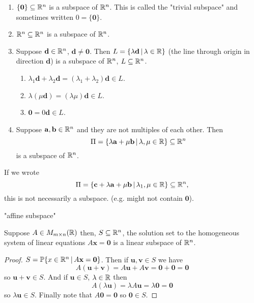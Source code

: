 \documentclass[10pt, a4paper]{article}
\newcommand{\mbf}[1]{\mathbf{#1}}
\begin{document}
\begin{example}\phantom{}
    \begin{enumerate}[label = (\roman*)]
        \item $\{\mbf{0}\} \subseteq \R ^ n$ is a subspace of $\mathbb{R} ^ n$.
        This is called the "trivial subspace" and sometimes written $0 = \{\mbf{0}\}$.
        \item $\mathbb{R} ^ n \subseteq \mathbb{R} ^ n$ is a subspace of $\mathbb{R} ^ n$.
        \item Suppose $\mbf{d} \in \R ^ n$, $\mbf{d \neq 0}$.
        Then $L = \{\lambda\mbf{d}\,|\,\lambda \in \R\}$
        (the line through origin in direction $\mbf{d}$)
        is a subspace of $\mathbb{R} ^ n$, $L \subseteq \mathbb{R} ^ n$.
            \begin{enumerate}[label = (\roman*)]
                \item $\lambda_1 \mbf{d} + \lambda_2\mbf{d} = (\lambda_1 + \lambda_2)\mbf{d} \in L$.
                \item $\lambda(\mu\mbf{d}) = (\lambda\mu)\mbf{d} \in L$.
                \item $\mbf{0} = 0\mbf{d} \in L$.
            \end{enumerate}
        \item Suppose $\mbf{a, b} \in \R ^ n$ and they are not multiples of each other.
        Then
        \[
        \Pi = \{\lambda\mbf{a} + \mu\mbf{b}\,|\,\lambda, \mu \in \R\} \subseteq \R ^ n
        \]
        is a subspace of $\mathbb{R} ^ n$.
    \end{enumerate}
    If we wrote
    \[
    \Pi = \{\mbf{c} + \lambda\mbf{a} + \mu\mbf{b}\,|\,\lambda_1, \mu \in \R\} \subseteq \R ^ n,
    \]
    this is not necessarily a subspace.
    (e.g. might not contain $\mbf{0}$).
\end{example}

"affine subspace"

\begin{proposition}
    Suppose $A \in M_{m \times n}(\mathbb{R})$ then,
    $S \subseteq \mathbb{R} ^ n$,
    the solution set to the homogeneous system of linear equations $A\mbf{x} = \mbf{0}$ is a linear subspace of $\mathbb{R} ^ n$.
    \begin{proof}
        $S = \P\{x \in \R ^ n\,|\, A\mbf{x} = \mbf{0}\}$.
        Then if $\mbf{u, v} \in S$ we have
        \[
        A(\mbf{u + v}) = A\mbf{u} + A\mbf{v} = \mbf{0} + \mbf{0} = \mbf{0}
        \]
        so $\mbf{u + v} \in S$.
        And if $\mbf{u} \in S$, $\lambda \in \mathbb{R}$ then
        \[
        A(\lambda\mbf{u}) = \lambda A\mbf{u} = \lambda\mbf{0} = \mbf{0}
        \]
        so $\lambda\mbf{u} \in S$.
        Finally note that $A\mbf{0} = \mbf{0}$ so $\mbf{0} \in S$.
    \end{proof}
\end{proposition}
\end{document}

